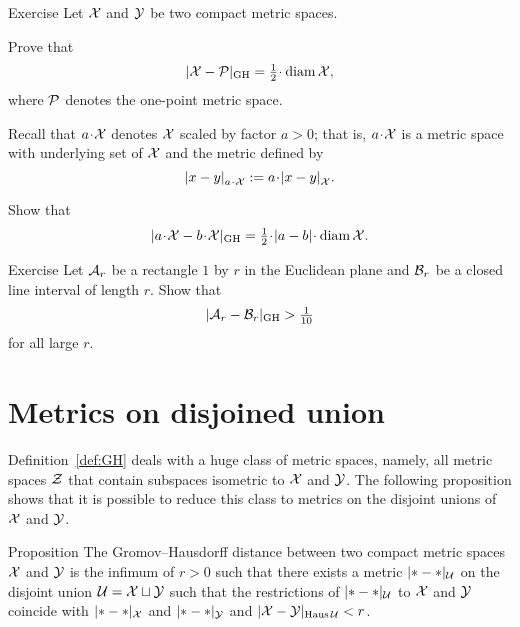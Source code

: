\begin{thm}{Exercise}\label{ex:d_GH-and-diam}
Let $\mathcal{X}$ and $\mathcal{Y}$ be two compact metric spaces.

\begin{subthm}{}
Prove that 
$$|\spc{X}-\spc{P}|_{\GH}=\tfrac12\cdot \diam \spc{X},$$
where $\mathcal{P}$ denotes the one-point metric space.
\end{subthm}

Recall that $a\cdot\spc{X}$ denotes $\mathcal{X}$ scaled by factor $a>0$;
that is, $a\cdot\spc{X}$ is a metric space with underlying set of $\mathcal{X}$ and the metric defined by
\[\dist{x}{y}{a\cdot\spc{X}}\df a\cdot\dist{x}{y}{\spc{X}}.\]

\begin{subthm}{}
Show that 
\[|a\cdot\spc{X}-b\cdot \spc{X}|_{\GH}=\tfrac12\cdot|a-b|\cdot\diam\spc{X}.\]
\end{subthm}


\end{thm}

\begin{thm}{Exercise}\label{ex:rectangle}
Let $\mathcal{A}_r$ be a rectangle $1$ by $r$ in the Euclidean plane 
and $\mathcal{B}_r$ be a closed line interval of length $r$.
Show that 
\[|\mathcal{A}_r-\mathcal{B}_r|_{\operatorname{\rm GH}\nolimits}>\tfrac1{10}\]
for all large $r$.
\end{thm}



\section{Metrics on disjoined union}

Definition~\ref{def:GH} deals with a huge class of metric spaces,
namely, all metric spaces $\mathcal{Z}$ that contain subspaces isometric to $\mathcal{X}$ and $\mathcal{Y}$.
The following proposition shows that it is possible to reduce this class to metrics on the disjoint unions of $\mathcal{X}$ and $\mathcal{Y}$. 

\begin{thm}{Proposition}\label{prop:GH=X+Y}
The Gromov--Hausdorff distance between two compact metric spaces $\mathcal{X}$
and $\mathcal{Y}$ is the infimum of $r > 0$ such that there exists a metric
$|{*}-{*}|_{\mathcal{U}}$ on the disjoint union $\mathcal{U}=\mathcal{X}\sqcup \mathcal{Y}$ 
such that the restrictions of $|{*}-{*}|_{\mathcal{U}}$ to $\mathcal{X}$ and $\mathcal{Y}$
coincide with $|{*}-{*}|_{\mathcal{X}}$ and $|{*}-{*}|_{\mathcal{Y}}$ 
and $|\mathcal{X}-\mathcal{Y}|_{\operatorname{\rm Haus}\nolimits\mathcal{U}} < r$. 
\end{thm}

